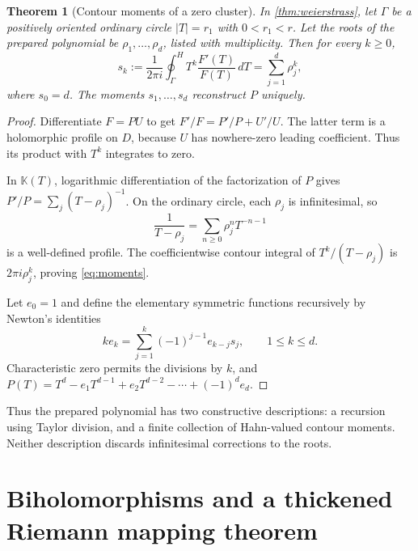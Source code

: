 \documentclass[11pt,a4paper]{article}
\numberwithin{equation}{section}
\newtheorem{theorem}{Theorem}[section]
\theoremstyle{definition}
\newcommand{\K}{\mathbb K}
\newcommand{\hoint}{\oint^{\!H}}
\begin{document}
\begin{theorem}[Contour moments of a zero cluster]\label{thm:moments}
In \cref{thm:weierstrass}, let $\Gamma$ be a positively oriented ordinary
circle $|T|=r_1$ with $0<r_1<r$. Let the roots of the prepared polynomial be
$\rho_1,\ldots,\rho_d$, listed with multiplicity. Then for every $k\geq0$,
\begin{equation}\label{eq:moments}
 s_k:=\frac1{2\pi i}\hoint_\Gamma
         T^k\frac{F'(T)}{F(T)}\,dT
      =\sum_{j=1}^d\rho_j^k,
\end{equation}
where $s_0=d$. The moments $s_1,\ldots,s_d$ reconstruct $P$ uniquely.
\end{theorem}
\begin{proof}
Differentiate $F=PU$ to get $F'/F=P'/P+U'/U$. The latter term is a
holomorphic profile on $D$, because $U$ has nowhere-zero leading coefficient.
Thus its product with $T^k$ integrates to zero.

In $\K(T)$, logarithmic differentiation of the factorization of $P$ gives
$P'/P=\sum_j(T-\rho_j)^{-1}$. On the ordinary circle, each $\rho_j$ is
infinitesimal, so
\[
 \frac1{T-\rho_j}=\sum_{n\geq0}\rho_j^nT^{-n-1}
\]
is a well-defined profile. The coefficientwise contour integral of
$T^k/(T-\rho_j)$ is $2\pi i\rho_j^k$, proving \eqref{eq:moments}.

Let $e_0=1$ and define the elementary symmetric functions recursively by
Newton's identities
\begin{equation}\label{eq:newtonidentities}
 k e_k=\sum_{j=1}^k(-1)^{j-1}e_{k-j}s_j,\qquad 1\leq k\leq d.
\end{equation}
Characteristic zero permits the divisions by $k$, and
$P(T)=T^d-e_1T^{d-1}+e_2T^{d-2}-\cdots+(-1)^de_d$.
\end{proof}

Thus the prepared polynomial has two constructive descriptions: a recursion
using Taylor division, and a finite collection of Hahn-valued contour moments.
Neither description discards infinitesimal corrections to the roots.

\section{Biholomorphisms and a thickened Riemann mapping theorem}
\end{document}
